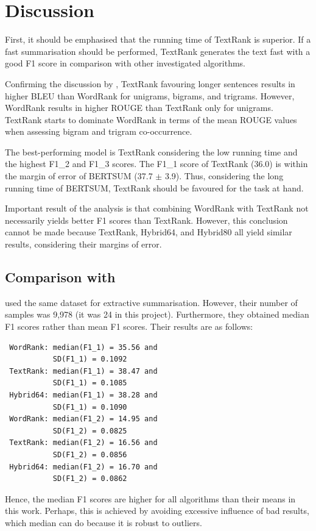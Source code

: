 \documentclass[11pt]{article}
\begin{document}
\section{Discussion}

First, it should be emphasised that the running time of TextRank is superior. If a fast summarisation should be performed, TextRank generates the text fast with a good F1 score in comparison with other investigated algorithms. 

Confirming the discussion by \citet{reza2020}, TextRank favouring longer sentences results in higher BLEU than WordRank for unigrams, bigrams, and  trigrams. However, WordRank results in higher ROUGE than TextRank only for unigrams. TextRank starts to dominate WordRank in terms of the mean ROUGE values when assessing bigram and trigram co-occurrence.

The best-performing model is TextRank considering the low running time and the highest F1\_2 and F1\_3 scores. The F1\_1 score of TextRank (36.0) is within the margin of error of BERTSUM (37.7 $\pm$ 3.9). Thus, considering the long running time of BERTSUM, TextRank should be favoured for the task at hand.

Important result of the analysis is that combining WordRank with TextRank not necessarily yields better F1 scores than TextRank. However, this conclusion cannot be made because TextRank, Hybrid64, and Hybrid80 all yield similar results, considering their margins of error.

\subsection{Comparison with \citet{reza2020}}

\citet{reza2020} used the same dataset for extractive summarisation. However, their number of samples was 9,978 (it was 24 in this project). Furthermore, they obtained median F1 scores rather than mean F1 scores. Their results are as follows:
\begin{verbatim}
 WordRank: median(F1_1) = 35.56 and 
           SD(F1_1) = 0.1092 
 TextRank: median(F1_1) = 38.47 and 
           SD(F1_1) = 0.1085 
 Hybrid64: median(F1_1) = 38.28 and 
           SD(F1_1) = 0.1090 
 WordRank: median(F1_2) = 14.95 and 
           SD(F1_2) = 0.0825  
 TextRank: median(F1_2) = 16.56 and 
           SD(F1_2) = 0.0856 
 Hybrid64: median(F1_2) = 16.70 and 
           SD(F1_2) = 0.0862  
\end{verbatim}

Hence, the median F1 scores are higher for all algorithms than their means in this work. Perhaps, this is achieved by avoiding excessive influence of bad results, which median can do because it is robust to outliers. 
\end{document}
